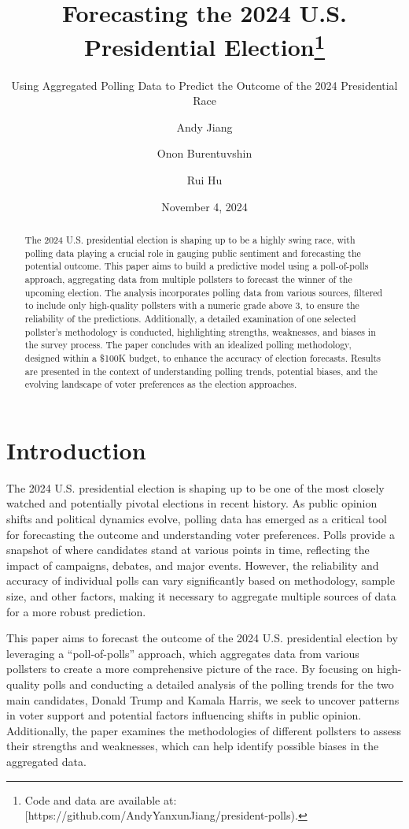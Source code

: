 \documentclass[
  letterpaper,
  DIV=11,
  numbers=noendperiod]{scrartcl}
\title{Forecasting the 2024 U.S. Presidential Election\thanks{Code and
data are available at:
{[}https://github.com/AndyYanxunJiang/president-polls).}}
\subtitle{Using Aggregated Polling Data to Predict the Outcome of the
2024 Presidential Race}
\author{Andy Jiang \and Onon Burentuvshin \and Rui Hu}
\date{November 4, 2024}
\begin{document}
\maketitle
\begin{abstract}
The 2024 U.S. presidential election is shaping up to be a highly swing
race, with polling data playing a crucial role in gauging public
sentiment and forecasting the potential outcome. This paper aims to
build a predictive model using a poll-of-polls approach, aggregating
data from multiple pollsters to forecast the winner of the upcoming
election. The analysis incorporates polling data from various sources,
filtered to include only high-quality pollsters with a numeric grade
above 3, to ensure the reliability of the predictions. Additionally, a
detailed examination of one selected pollster's methodology is
conducted, highlighting strengths, weaknesses, and biases in the survey
process. The paper concludes with an idealized polling methodology,
designed within a \$100K budget, to enhance the accuracy of election
forecasts. Results are presented in the context of understanding polling
trends, potential biases, and the evolving landscape of voter
preferences as the election approaches.
\end{abstract}
\ifdefined\Shaded\renewenvironment{Shaded}{\begin{tcolorbox}[enhanced, breakable, interior hidden, borderline west={3pt}{0pt}{shadecolor}, sharp corners, frame hidden, boxrule=0pt]}{\end{tcolorbox}}\fi

\hypertarget{introduction}{%
\section{Introduction}\label{introduction}}

The 2024 U.S. presidential election is shaping up to be one of the most
closely watched and potentially pivotal elections in recent history. As
public opinion shifts and political dynamics evolve, polling data has
emerged as a critical tool for forecasting the outcome and understanding
voter preferences. Polls provide a snapshot of where candidates stand at
various points in time, reflecting the impact of campaigns, debates, and
major events. However, the reliability and accuracy of individual polls
can vary significantly based on methodology, sample size, and other
factors, making it necessary to aggregate multiple sources of data for a
more robust prediction.

This paper aims to forecast the outcome of the 2024 U.S. presidential
election by leveraging a ``poll-of-polls'' approach, which aggregates
data from various pollsters to create a more comprehensive picture of
the race. By focusing on high-quality polls and conducting a detailed
analysis of the polling trends for the two main candidates, Donald Trump
and Kamala Harris, we seek to uncover patterns in voter support and
potential factors influencing shifts in public opinion. Additionally,
the paper examines the methodologies of different pollsters to assess
their strengths and weaknesses, which can help identify possible biases
in the aggregated data.
\end{document}
